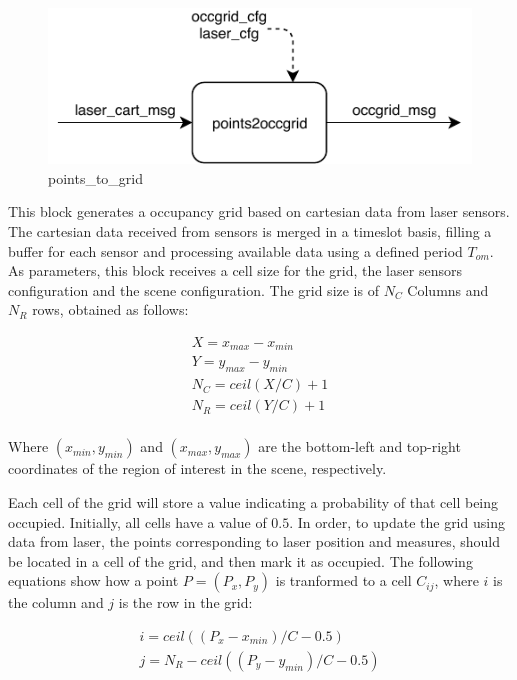 \begin{description}
\begin{figure}[ht!]
\centering
\includegraphics[scale=1]{fig/3/points_to_grid.pdf}
\caption{points\_to\_grid}
\label{points_to_grid}
\end{figure}

This block generates a occupancy grid based on cartesian data from laser sensors. The cartesian data received from sensors is merged in a timeslot basis, filling a buffer for each sensor and processing available data using a defined period $T_{om}$. As parameters, this block receives a cell size for the grid, the laser sensors configuration and the scene configuration. The grid size is of $N_C$ Columns and $N_R$ rows, obtained as follows:

\begin{eqnarray*}
X = x_{max}-x_{min} \\
Y = y_{max}-y_{min} \\
N_C = ceil(X/C)+1 \\
N_R = ceil(Y/C)+1 \\
\end{eqnarray*}

Where $(x_{min}, y_{min})$ and $(x_{max}, y_{max})$ are the bottom-left and top-right coordinates of the region of interest in the scene, respectively.

Each cell of the grid will store a value indicating a probability of that cell being occupied. Initially, all cells have a value of $0.5$. In order, to update the grid using data from laser, the points corresponding to laser position and measures, should be located in a cell of the grid, and then mark it as occupied. The following equations show how a point $P = (P_x, P_y)$ is tranformed to a cell $C_{ij}$, where $i$ is the column and $j$ is the row in the grid:

\begin{eqnarray*}
i = ceil((P_x - x_{min})/C - 0.5) \\
j = N_R - ceil((P_y - y_{min})/C - 0.5) \\
\end{eqnarray*}


\end{description}

